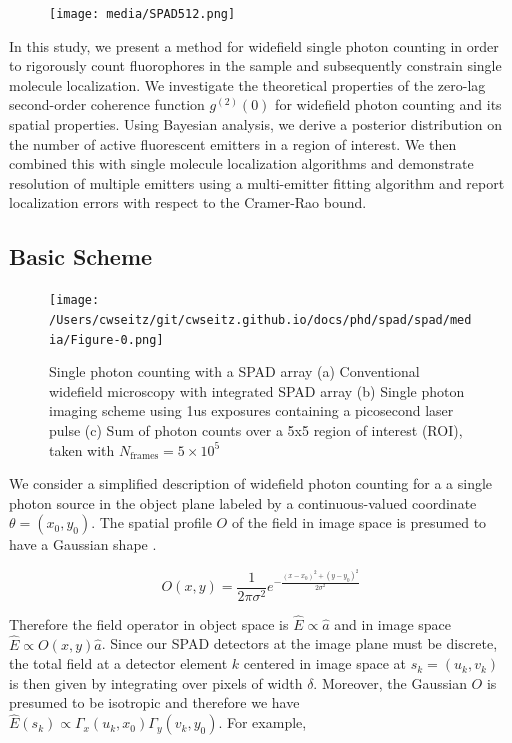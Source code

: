 \begin{figure}[t]
\centering
\texttt{[image: media/SPAD512.png]}
\caption{}
\end{figure}    


In this study, we present a method for widefield single photon counting in order to rigorously count fluorophores in the sample and subsequently constrain single molecule localization. We investigate the theoretical properties of the zero-lag second-order coherence function $g^{(2)}(0)$ for widefield photon counting and its spatial properties. Using Bayesian analysis, we derive a posterior distribution on the number of active fluorescent emitters in a region of interest. We then combined this with single molecule localization algorithms and demonstrate resolution of multiple emitters using a multi-emitter fitting algorithm and report localization errors with respect to the Cramer-Rao bound.

\subsection{Basic Scheme}

\begin{figure}[t]
\centering
\texttt{[image: /Users/cwseitz/git/cwseitz.github.io/docs/phd/spad/spad/media/Figure-0.png]}
\caption{Single photon counting with a SPAD array (a) Conventional widefield microscopy with integrated SPAD array (b) Single photon imaging scheme using 1us exposures containing a picosecond laser pulse (c) Sum of photon counts over a 5x5 region of interest (ROI), taken with $N_{\mathrm{frames}}=5\times 10^{5}$}
\end{figure}    

We consider a simplified description of widefield photon counting for a a single photon source in the object plane labeled by a continuous-valued coordinate $\theta=(x_0,y_0)$. The spatial profile $O$ of the field in image space is presumed to have a Gaussian shape \parencite{Zhang2007,Richards1959,Gibson1989}.

\begin{equation}
O(x,y) = \frac{1}{2\pi\sigma^{2}}e^{-\frac{(x-x_{0})^2+(y-y_{0})^2}{2\sigma^2}}
\end{equation}

Therefore the field operator in object space is $\hat{E} \propto \hat{a}$ and in image space $\hat{E} \propto O(x,y)\hat{a}$. Since our SPAD detectors at the image plane must be discrete, the total field at a detector element $k$ centered in image space at $s_k=(u_k,v_k)$ is then given by integrating over pixels of width $\delta$. Moreover, the Gaussian $O$ is presumed to be isotropic and therefore we have $\hat{E}(s_k) \propto \Gamma_{x}(u_k,x_{0})\Gamma_{y}(v_k,y_0)$. For example,

